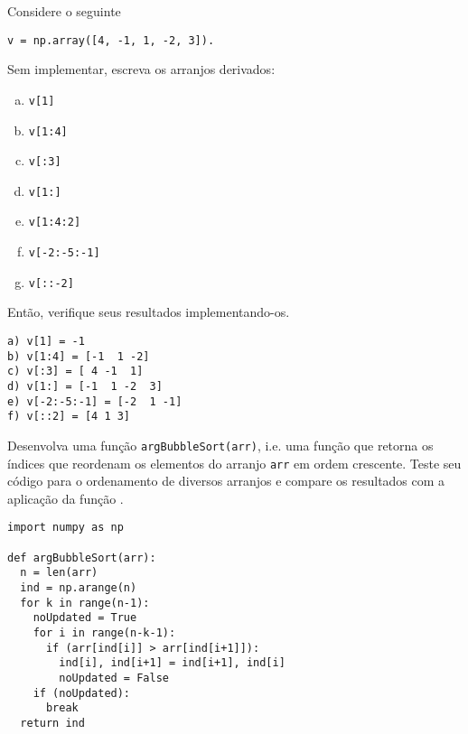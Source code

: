 \begin{exer}
  Considere o seguinte {\PYTHONnumpyDOTarray}

\begin{lstlisting}
v = np.array([4, -1, 1, -2, 3]).
\end{lstlisting}

Sem implementar, escreva os arranjos derivados:
  \begin{enumerate}[a)]
  \item \lstinline+v[1]+
  \item \lstinline+v[1:4]+
  \item \lstinline+v[:3]+
  \item \lstinline+v[1:]+
  \item \lstinline+v[1:4:2]+
  \item \lstinline+v[-2:-5:-1]+
  \item \lstinline+v[::-2]+
  \end{enumerate}
  Então, verifique seus resultados implementando-os.
\end{exer}
\begin{resp}
  
\begin{verbatim}
a) v[1] = -1
b) v[1:4] = [-1  1 -2]
c) v[:3] = [ 4 -1  1]
d) v[1:] = [-1  1 -2  3]
e) v[-2:-5:-1] = [-2  1 -1]
f) v[::2] = [4 1 3]  
\end{verbatim}

\end{resp}

\begin{exer}
  Desenvolva uma função \lstinline+argBubbleSort(arr)+, i.e. uma função que retorna os índices que reordenam os elementos do arranjo \lstinline+arr+ em ordem crescente. Teste seu código para o ordenamento de diversos arranjos e compare os resultados com a aplicação da função {\PYTHONnumpyDOTargsort}.
\end{exer}
\begin{resp}

\begin{lstlisting}
import numpy as np

def argBubbleSort(arr):
  n = len(arr)
  ind = np.arange(n)
  for k in range(n-1):
    noUpdated = True
    for i in range(n-k-1):
      if (arr[ind[i]] > arr[ind[i+1]]):
        ind[i], ind[i+1] = ind[i+1], ind[i]
        noUpdated = False
    if (noUpdated):
      break
  return ind
\end{lstlisting}

\end{resp}

